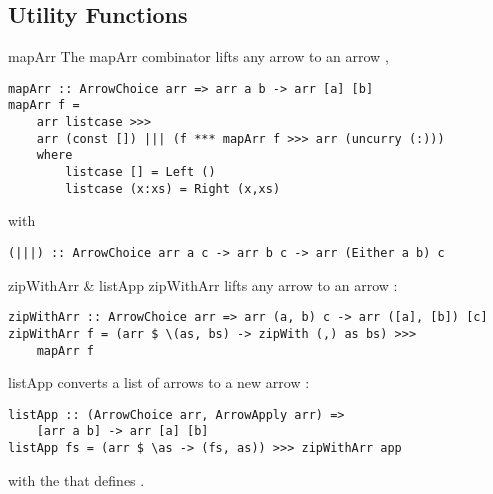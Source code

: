 \subsection{Utility Functions}\label{utilfns}
\begin{frame}[fragile]{mapArr}
The mapArr combinator lifts any arrow  to an arrow  \cite{programming_with_arrows},
\begin{lstlisting}[frame=htrbl]
mapArr :: ArrowChoice arr => arr a b -> arr [a] [b]
mapArr f =
	arr listcase >>>
	arr (const []) ||| (f *** mapArr f >>> arr (uncurry (:)))
	where
		listcase [] = Left ()
		listcase (x:xs) = Right (x,xs)
\end{lstlisting}
with
\begin{lstlisting}[frame=htrbl]
(|||) :: ArrowChoice arr a c -> arr b c -> arr (Either a b) c
\end{lstlisting}
\end{frame}

\begin{frame}[fragile]{zipWithArr \& listApp}
zipWithArr lifts any arrow  to an arrow :
\begin{lstlisting}[frame=htrbl]
zipWithArr :: ArrowChoice arr => arr (a, b) c -> arr ([a], [b]) [c]
zipWithArr f = (arr $ \(as, bs) -> zipWith (,) as bs) >>>
	mapArr f
\end{lstlisting}
listApp converts a list of arrows \code{[arr a b]} to a new arrow :
\begin{lstlisting}[frame=htrbl]
listApp :: (ArrowChoice arr, ArrowApply arr) =>
	[arr a b] -> arr [a] [b]
listApp fs = (arr $ \as -> (fs, as)) >>> zipWithArr app
\end{lstlisting}
with the  that defines .
\end{frame}
